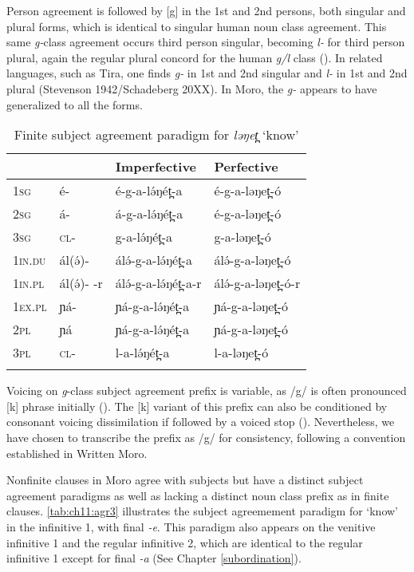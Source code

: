 Person agreement is followed by [g] in the 1st and 2nd persons, both singular and plural forms, which is identical to singular human noun class agreement. This same \textit{g-}class agreement occurs third person singular, becoming \textit{l-} for third person plural, again the regular plural concord for the human \textit{g/l} class (). In related languages, such as Tira, one finds \textit{g-} in 1st and 2nd singular and \textit{l-} in 1st and 2nd plural (Stevenson 1942/Schadeberg 20XX). In Moro, the \textit{g-} appears to have generalized to all the forms.  %

\begin{table}
	\begin{tabular}[t]{llll}
	\lsptoprule
	& &		Imperfective &	Perfective\\
	\midrule
1\textsc{sg}	& é-	& 	é-g-a-lə́ŋét̪-a & é-g-a-ləŋet̪-ó\\
2\textsc{sg}	& á-	&	á-g-a-lə́ŋét̪-a & é-g-a-ləŋet̪-ó\\
3\textsc{sg}	& \textsc{cl}-	&	g-a-lə́ŋét̪-a	 & g-a-ləŋet̪-ó\\
1\textsc{in}.\textsc{du} & ál(ə́)-	 & 	álə́-g-a-lə́ŋét̪-a		& 	álə́-g-a-ləŋet̪-ó\\
1\textsc{in}.\textsc{pl} & ál(ə́)-	-r &  álə́-g-a-lə́ŋét̪-a-r	 & álə́-g-a-ləŋet̪-ó-r\\
1\textsc{ex}.\textsc{pl} & ɲá-	& ɲá-g-a-lə́ŋét̪-a & ɲá-g-a-ləŋet̪-ó\\
2\textsc{pl}	& ɲá 	&	ɲá-g-a-lə́ŋét̪-a & ɲá-g-a-ləŋet̪-ó\\
3\textsc{pl}	& \textsc{cl}-	&	l-a-lə́ŋét̪-a	 & l-a-ləŋet̪-ó \\
	\lspbottomrule
	\end{tabular}
	\caption{Finite subject agreement paradigm for \textit{ləŋet̪} `know'}
	\label{tab:ch11:agr2}
\end{table}

Voicing on \textit{g}-class subject agreement prefix is variable, as /g/ is often pronounced [k] phrase initially (). The [k] variant of this prefix can also be conditioned by consonant voicing dissimilation if followed by a voiced stop (). Nevertheless, we have chosen to transcribe the prefix as /g/ for consistency, following a convention established in Written Moro.

Nonfinite clauses in Moro agree with subjects but have a distinct subject agreement paradigms as well as lacking a distinct noun class prefix as in finite clauses. \ref{tab:ch11:agr3} illustrates the subject agreemement paradigm for `know' in the infinitive 1, with final \textit{-e}. This paradigm also appears on the venitive infinitive 1 and the regular infinitive 2, which are identical to the regular infinitive 1 except for final \textit{-a} (See Chapter \ref{subordination}).

